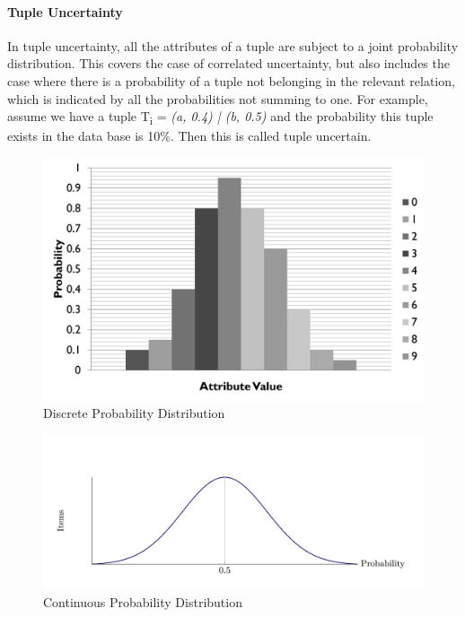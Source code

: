 \paragraph{Tuple Uncertainty}
In tuple uncertainty, all the attributes of a tuple are subject to a joint probability distribution. This covers the case of correlated uncertainty, but also includes the case where there is a probability of a tuple not belonging in the relevant relation, which is indicated by all the probabilities not summing to one. For example, assume we have a tuple T\textsubscript{i} = \emph{(a, 0.4) | (b, 0.5)} and the probability this tuple exists in the data base is 10\%. Then this is called tuple uncertain.
		\begin{figure}
		\centering
			\includegraphics[width=1\textwidth]{../images/d_probability}
		\caption{Discrete Probability Distribution}
		\label{figure:d_probability}
		\end{figure}
		\begin{figure}
		\centering
			\includegraphics[width=1\textwidth]{../images/c_probability}
		\caption{Continuous Probability Distribution}
		\label{figure:c_probability}
		\end{figure}
